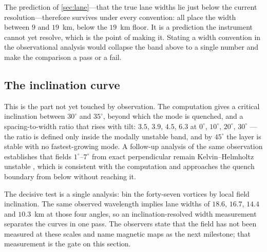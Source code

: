 \documentclass[11pt]{article}
\renewcommand{\S}{\mathhexbox278}
\theoremstyle{definition}
\theoremstyle{remark}
\begin{document}
The prediction of \S\ref{sec:lane}---that the true lane widths lie just below
the current resolution---therefore survives under every convention: all place
the width between $9$ and $19$~km, below the $19$~km floor. It is a
prediction the instrument cannot yet resolve, which is the point of making
it. Stating a width convention in the observational analysis would collapse
the band above to a single number and make the comparison a pass or a fail.

\subsection{The inclination curve}
This is the part not yet touched by observation. The computation gives a
critical inclination between $30^\circ$ and $35^\circ$, beyond which the mode
is quenched, and a spacing-to-width ratio that rises with tilt: $3.5$, $3.9$,
$4.5$, $6.3$ at $0^\circ$, $10^\circ$, $20^\circ$, $30^\circ$ --- the ratio is
defined only inside the modally unstable band, and by $45^\circ$ the layer is
stable with no fastest-growing mode. A follow-up
analysis of the same observation establishes that fields $1^\circ$--$7^\circ$
from exact perpendicular remain Kelvin--Helmholtz unstable \cite{nykyri},
which is consistent with the computation and approaches the quench boundary
from below without reaching it.

The decisive test is a single analysis: bin the forty-seven vortices by local
field inclination. The same observed wavelength implies lane widths of
$18.6$, $16.7$, $14.4$ and $10.3$~km at those four angles, so an
inclination-resolved width measurement separates the curves in one pass. The
observers state that the field has not been measured at these scales and name
magnetic maps as the next milestone; that measurement is the gate on this
section.
\end{document}
